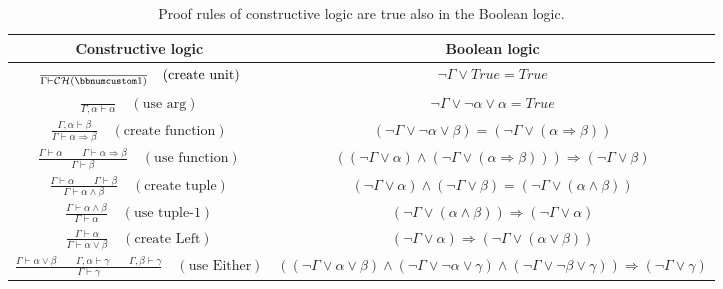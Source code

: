 \begin{table}
\begin{centering}
\begin{tabular}{|c|c|}
\hline 
\textbf{\small{}Constructive logic} & \textbf{\small{}Boolean logic}\tabularnewline
\hline 
\hline 
{\small{}$\frac{}{\Gamma\vdash{\cal CH}(\bbnum 1)}\quad(\text{create unit})$} & {\small{}$\neg\Gamma\vee True=True$}\tabularnewline
\hline 
{\small{}$\frac{~}{\Gamma,\alpha\vdash\alpha}\quad(\text{use arg})$} & {\small{}$\neg\Gamma\vee\neg\alpha\vee\alpha=True$}\tabularnewline
\hline 
{\small{}$\frac{\Gamma,\alpha\vdash\beta}{\Gamma\vdash\alpha\Rightarrow\beta}\quad(\text{create function})$} & {\small{}$\left(\neg\Gamma\vee\neg\alpha\vee\beta\right)=\left(\neg\Gamma\vee\left(\alpha\Rightarrow\beta\right)\right)$}\tabularnewline
\hline 
{\small{}$\frac{\Gamma\vdash\alpha\quad\quad\Gamma\vdash\alpha\Rightarrow\beta}{\Gamma\vdash\beta}\quad(\text{use function})$} & {\small{}$\left(\left(\neg\Gamma\vee\alpha\right)\wedge\left(\neg\Gamma\vee\left(\alpha\Rightarrow\beta\right)\right)\right)\Rightarrow\left(\neg\Gamma\vee\beta\right)$}\tabularnewline
\hline 
{\small{}$\frac{\Gamma\vdash\alpha\quad\quad\Gamma\vdash\beta}{\Gamma\vdash\alpha\wedge\beta}\quad(\text{create tuple})$} & {\small{}$\left(\neg\Gamma\vee\alpha\right)\wedge\left(\neg\Gamma\vee\beta\right)=\left(\neg\Gamma\vee\left(\alpha\wedge\beta\right)\right)$}\tabularnewline
\hline 
{\small{}$\frac{\Gamma\vdash\alpha\wedge\beta}{\Gamma\vdash\alpha}\quad(\text{use tuple-}1)$} & {\small{}$\left(\neg\Gamma\vee\left(\alpha\wedge\beta\right)\right)\Rightarrow\left(\neg\Gamma\vee\alpha\right)$}\tabularnewline
\hline 
{\small{}$\frac{\Gamma\vdash\alpha}{\Gamma\vdash\alpha\vee\beta}\quad(\text{create Left})$} & {\small{}$\left(\neg\Gamma\vee\alpha\right)\Rightarrow\left(\neg\Gamma\vee\left(\alpha\vee\beta\right)\right)$}\tabularnewline
\hline 
{\small{}$\frac{\Gamma\vdash\alpha\vee\beta\quad\quad\Gamma,\alpha\vdash\gamma\quad\quad\Gamma,\beta\vdash\gamma}{\Gamma\vdash\gamma}\quad(\text{use Either})$} & {\small{}$\left(\left(\neg\Gamma\vee\alpha\vee\beta\right)\wedge\left(\neg\Gamma\vee\neg\alpha\vee\gamma\right)\wedge\left(\neg\Gamma\vee\neg\beta\vee\gamma\right)\right)\Rightarrow\left(\neg\Gamma\vee\gamma\right)$}\tabularnewline
\hline 
\end{tabular}
\par\end{centering}
\caption{Proof rules of constructive logic are true also in the Boolean logic.\label{tab:Proof-rules-of-constructive-and-boolean}}
\end{table}


